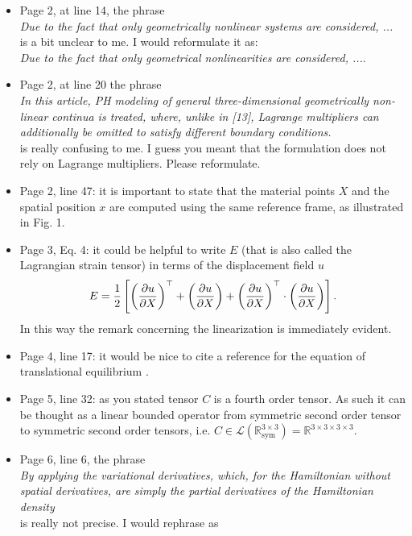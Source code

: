 \documentclass[a4paper, 10pt]{article}
\newcommand{\bbR}{\mathbb{R}}
\begin{document}
	\begin{itemize}
	\item Page 2, at line 14, the phrase\\
		\textit{Due to the fact that only geometrically nonlinear systems are considered, ...} \\
		is a bit unclear to me. I would reformulate it as: \\
		\textit{Due to the fact that only geometrical nonlinearities are considered, ...}.
		\item Page 2, at line 20 the phrase\\
		\textit{In this article, PH modeling of general three-dimensional geometrically non-linear continua is  treated, where, unlike in [13], Lagrange multipliers can additionally be omitted to satisfy different boundary conditions.}\\
		is really confusing to me. I guess you meant that the formulation does not rely on Lagrange multipliers. Please reformulate.
		\item Page 2, line 47: it is important to state that the material points $X$ and the spatial position $x$ are computed using the same reference frame, as illustrated in Fig. 1.
		\item  Page 3, Eq. 4: it could be helpful to write $E$ (that is also called the Lagrangian strain tensor) in terms of the displacement field $u$
		\begin{equation}
			E =\frac{1}{2} \left[ \left(\diffp{u}{X}\right)^\top + \left(\diffp{u}{X}\right) + \left(\diffp{u}{X}\right)^\top \cdot \left(\diffp{u}{X}\right) \right].
		\end{equation}
		In this way the remark concerning the linearization is immediately evident.
		\item Page 4, line 17: it would be nice to cite a reference for the equation of translational equilibrium .
		\item Page 5, line 32: as you stated tensor $C$ is a fourth order tensor. As such it can be thought as a linear bounded operator from symmetric second order tensor to symmetric second order tensors, i.e.
		$C \in \mathcal{L}(\bbR^{3 \times 3}_{\text{sym}}) = \bbR^{3 \times 3 \times 3 \times 3}$.
		\item Page 6, line 6, the phrase\\
		\textit{By applying the variational
			derivatives, which, for the Hamiltonian without spatial derivatives, are simply the
			partial derivatives of the Hamiltonian density} \\
		is really not precise. I would rephrase as \\

\end{itemize}
\end{document}
